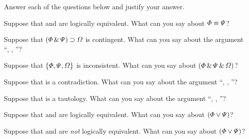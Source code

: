 \solutions
\problempart
\label{pr.TT.concepts}
Answer each of the questions below and justify your answer.
\begin{earg}
\item Suppose that \metaA{} and \metaB{} are logically equivalent. What can you say about $\varPhi{}\equiv\varPsi{}$?
\item Suppose that $(\varPhi{}\,\&\,\varPsi{})\supset\varOmega{}$ is contingent. What can you say about the argument ``\metaA{}, \metaB{}, \therefore\metaC{}''?
\item Suppose that $\{\varPhi{},\varPsi{}, \varOmega{}\}$ is inconsistent. What can you say about $(\varPhi{}\,\&\,\varPsi{}\,\&\,\varOmega{})$?
\item Suppose that \metaA{} is a contradiction. What can you say about the argument ``\metaA{}, \metaB{}, \therefore\metaC{}''?
\item Suppose that \metaC{} is a tautology. What can you say about the argument ``\metaA{}, \metaB{}, \therefore\metaC{}''?
\item Suppose that \metaA{} and \metaB{} are logically equivalent. What can you say about $(\varPhi{}\vee\varPsi{})$?
\item Suppose that \metaA{} and \metaB{} are \emph{not} logically equivalent. What can you say about $(\varPhi{}\vee\varPsi{})$?
\end{earg}

